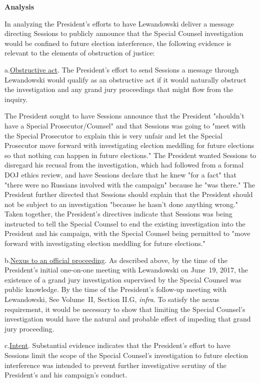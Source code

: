 \begin{center}
\textbf{Analysis}
\end{center}

In analyzing the President's efforts to have Lewandowski deliver a message directing Sessions to publicly announce that the Special Counsel investigation would be confined to future election interference, the following evidence is relevant to the elements of obstruction of justice:

a.\qquad\underline{Obstructive act}.
The President's effort to send Sessions a message through Lewandowski would qualify as an obstructive act if it would naturally obstruct the investigation and any grand jury proceedings that might flow from the inquiry.

The President sought to have Sessions announce that the President "shouldn't have a Special Prosecutor/Counsel" and that Sessions was going to "meet with the Special Prosecutor to explain this is very unfair and let the Special Prosecutor move forward with investigating election meddling for future elections so that nothing can happen in future elections."
The President wanted Sessions to disregard his recusal from the investigation, which had followed from a formal DOJ ethics review, and have Sessions declare that he knew "for a fact" that "there were no Russians involved with the campaign" because he "was there."
The President further directed that Sessions should explain that the President should not be subject to an investigation "because he hasn't done anything wrong."
Taken together, the President's directives indicate that Sessions was being instructed to tell the Special Counsel to end the existing investigation into the President and his campaign, with the Special Counsel being permitted to "move forward with investigating election meddling for future elections."

b.\qquad\underline{Nexus to an official proceeding}.
As described above, by the time of the President's initial one-on-one meeting with Lewandowski on June~19, 2017, the existence of a grand jury investigation supervised by the Special Counsel was public knowledge.
By the time of the President's follow-up meeting with Lewandowski, 
See Volume~II, Section II.G, \textit{infra}.
To satisfy the nexus requirement, it would be necessary to show that limiting the Special Counsel's investigation would have the natural and probable effect of impeding that grand jury proceeding.

c.\qquad\underline{Intent}.
Substantial evidence indicates that the President's effort to have Sessions limit the scope of the Special Counsel's investigation to future election interference was intended to prevent further investigative scrutiny of the President's and his campaign's conduct.

